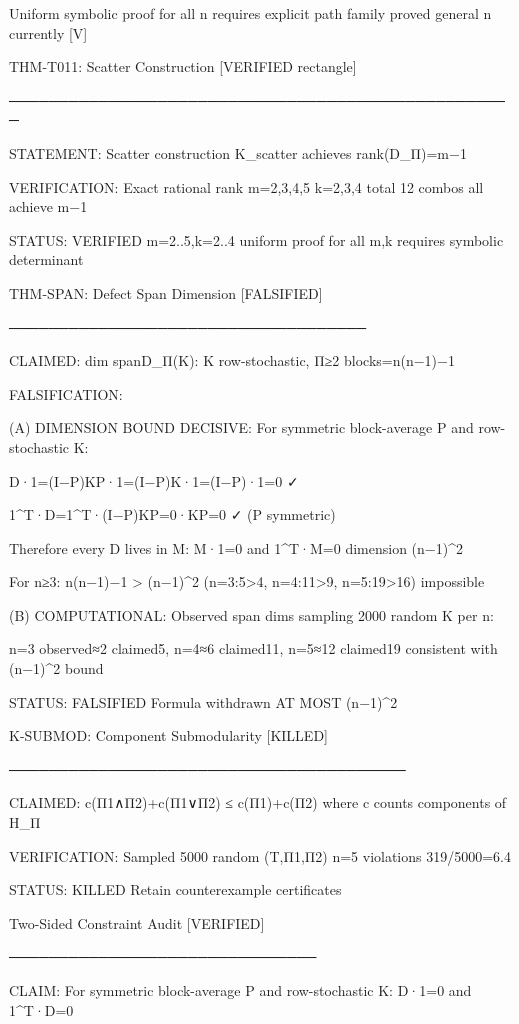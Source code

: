 Uniform symbolic proof for all n requires explicit path family proved general n currently [V]


THM-T011: Scatter Construction [VERIFIED rectangle]

───────────────────────────────────────────────────

STATEMENT: Scatter construction K_scatter achieves rank(D_Π)=m−1

VERIFICATION: Exact rational rank m=2,3,4,5 k=2,3,4 total 12 combos all achieve m−1

STATUS: VERIFIED m=2..5,k=2..4 uniform proof for all m,k requires symbolic determinant

THM-SPAN: Defect Span Dimension [FALSIFIED]

────────────────────────────────────

CLAIMED: dim span{D_Π(K): K row-stochastic, Π≥2 blocks}=n(n−1)−1

FALSIFICATION:

(A) DIMENSION BOUND DECISIVE: For symmetric block-average P and row-stochastic K:

D·1=(I−P)KP·1=(I−P)K·1=(I−P)·1=0 ✓

1^T·D=1^T·(I−P)KP=0·KP=0 ✓ (P symmetric)

Therefore every D lives in {M: M·1=0 and 1^T·M=0} dimension (n−1)^2

For n≥3: n(n−1)−1 > (n−1)^2 (n=3:5>4, n=4:11>9, n=5:19>16) impossible

(B) COMPUTATIONAL: Observed span dims sampling 2000 random K per n:

n=3 observed≈2 claimed5, n=4≈6 claimed11, n=5≈12 claimed19 consistent with (n−1)^2 bound

STATUS: FALSIFIED Formula withdrawn AT MOST (n−1)^2

K-SUBMOD: Component Submodularity [KILLED]

────────────────────────────────────────

CLAIMED: c(Π1∧Π2)+c(Π1∨Π2) ≤ c(Π1)+c(Π2) where c counts components of H_Π

VERIFICATION: Sampled 5000 random (T,Π1,Π2) n=5 violations 319/5000=6.4%

STATUS: KILLED Retain counterexample certificates

Two-Sided Constraint Audit [VERIFIED]

───────────────────────────────

CLAIM: For symmetric block-average P and row-stochastic K: D·1=0 and 1^T·D=0

